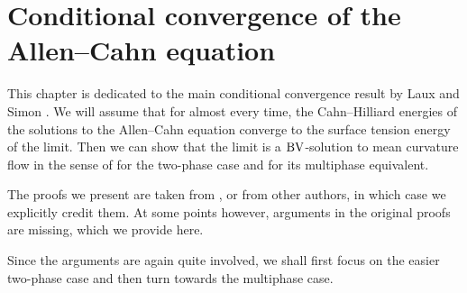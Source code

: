 \chapter{Conditional convergence of the Allen--Cahn equation}
\label{chapter_conditional_convergence_of_ac}

This chapter is dedicated to the main conditional convergence result by Laux 
and Simon 
\cite{convergence_of_allen_cahn_equation_to_multiphase_mean_curvature_flow}.
We will assume that for almost every time, the 
Cahn--Hilliard energies of the solutions to the Allen--Cahn equation converge 
to the surface tension energy of the limit. Then we can show that the limit is 
a $ \operatorname{BV} 
$-solution to mean curvature flow in the sense of  for the 
two-phase case and  for its multiphase equivalent.

The proofs we present are taken from 
\cite{convergence_of_allen_cahn_equation_to_multiphase_mean_curvature_flow}, 
or from other authors, 
in which case we explicitly credit them. At some points however, arguments 
in the original proofs are missing, which we provide here.

Since the arguments are again quite involved, we shall first focus on the 
easier 
two-phase case and then turn towards the multiphase case.



